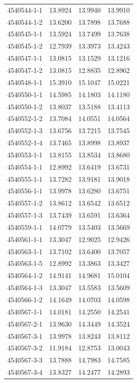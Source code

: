 \begin{longtable}{lrrr}
4540544-1-1 & 13.8924 & 13.9940 & 13.9910 \\
4540544-1-2 & 13.6200 & 13.7898 & 13.7688 \\
4540545-1-1 & 13.5924 & 13.7499 & 13.7638 \\
4540545-1-2 & 12.7939 & 13.3973 & 13.4243 \\
4540547-1-1 & 13.0815 & 13.1529 & 13.1216 \\
4540547-1-2 & 13.0815 & 12.8835 & 12.8962 \\
4540548-1-1 & 15.3910 & 15.1047 & 15.0221 \\
4540550-1-1 & 14.5985 & 14.1803 & 14.1180 \\
4540550-1-2 & 13.8037 & 13.5188 & 13.4113 \\
4540552-1-2 & 13.7084 & 14.0551 & 14.0564 \\
4540552-1-3 & 13.6756 & 13.7215 & 13.7545 \\
4540552-1-4 & 13.7465 & 13.8998 & 13.8937 \\
4540553-1-1 & 13.8155 & 13.8534 & 13.8680 \\
4540554-1-1 & 12.8992 & 13.6419 & 13.6731 \\
4540555-1-1 & 13.7282 & 13.9181 & 13.9018 \\
4540556-1-1 & 13.9978 & 13.6280 & 13.6751 \\
4540557-1-2 & 13.8612 & 13.6542 & 13.6512 \\
4540557-1-3 & 13.7439 & 13.6591 & 13.6364 \\
4540559-1-1 & 14.0779 & 13.5403 & 13.5669 \\
4540561-1-1 & 13.3047 & 12.9025 & 12.9426 \\
4540563-1-1 & 13.7102 & 13.6400 & 13.7057 \\
4540563-1-5 & 12.8992 & 13.3863 & 13.3427 \\
4540564-1-2 & 14.9141 & 14.9681 & 15.0104 \\
4540564-1-3 & 13.3047 & 13.5583 & 13.5609 \\
4540566-1-2 & 14.1649 & 14.0703 & 14.0598 \\
4540567-1-1 & 14.0181 & 14.2550 & 14.2541 \\
4540567-2-1 & 13.9630 & 14.3449 & 14.3524 \\
4540567-3-1 & 13.9978 & 13.8243 & 13.8112 \\
4540567-3-2 & 11.9184 & 12.8753 & 13.0043 \\
4540567-3-3 & 13.7888 & 14.7983 & 14.7585 \\
4540567-3-4 & 13.8327 & 14.2477 & 14.2893 \\

\end{longtable}
